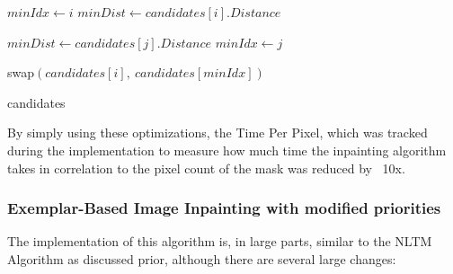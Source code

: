 \begin{algorithm}[ht!]
\caption{Nonlocal Texture Matching candidate Patch Partial Sort}
\label{alg:NLTMSort}
\begin{algorithmic}[3]

        \State $minIdx \gets i$
        \State $minDist \gets candidates[i].Distance$

                \State $minDist \gets candidates[j].Distance$
                \State $minIdx \gets j$
            \EndIf
        \EndFor

            \State swap$(candidates[i],\ candidates[minIdx])$
        \EndIf
    \EndFor

    \State \Return candidates
\EndFunction
\end{algorithmic}
\end{algorithm}

By simply using these optimizations, the Time Per Pixel, which was tracked during the implementation to measure how much time the inpainting algorithm takes in correlation to the pixel count of the mask was reduced by \string~10x.

\subsubsection{Exemplar-Based Image Inpainting with modified priorities}

The implementation of this algorithm is, in large parts, similar to the NLTM Algorithm as discussed prior, although there are several large changes:

